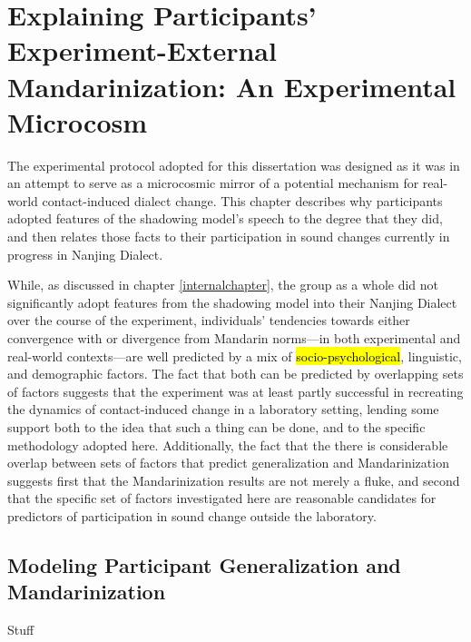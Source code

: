 \chapter{Explaining Participants' Experiment-External Mandarinization: An Experimental Microcosm}
\label{microcosmchapter}
The experimental protocol adopted for this dissertation was designed as it was in an attempt to serve as a microcosmic mirror of a potential mechanism for real-world contact-induced dialect change. This chapter describes why participants adopted features of the shadowing model's speech to the degree that they did, and then relates those facts to their participation in sound changes currently in progress in Nanjing Dialect.

While, as discussed in chapter \ref{internalchapter}, the group as a whole did not significantly adopt features from the shadowing model into their Nanjing Dialect over the course of the experiment, individuals' tendencies towards either convergence with or divergence from Mandarin norms---in both experimental and real-world contexts---are well predicted by a mix of \hl{socio-psychological}, linguistic, and demographic factors. The fact that both can be predicted by overlapping sets of factors suggests that the experiment was at least partly successful in recreating the dynamics of contact-induced change in a laboratory setting, lending some support both to the idea that such a thing can be done, and to the specific methodology adopted here. Additionally, the fact that the there is considerable overlap between sets of factors that predict generalization and Mandarinization suggests first that the Mandarinization results are not merely a fluke, and second that the specific set of factors investigated here are reasonable candidates for predictors of participation in sound change outside the laboratory.

\section{Modeling Participant Generalization and Mandarinization}
\label{sec:genAndMandModels}
Stuff
